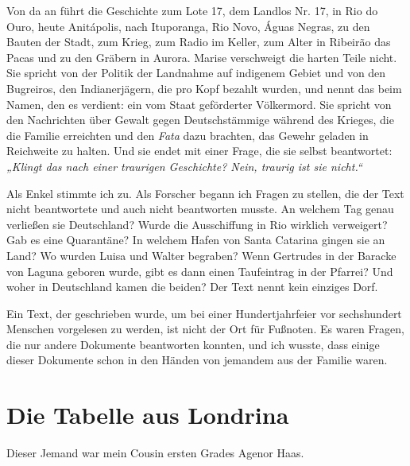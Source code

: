 \documentclass[
  ngerman,
  11pt,
  openany]{book}
\begin{document}
Von da an führt die Geschichte zum Lote 17, dem Landlos Nr. 17, in Rio
do Ouro, heute Anitápolis, nach Ituporanga, Rio Novo, Águas Negras, zu
den Bauten der Stadt, zum Krieg, zum Radio im Keller, zum Alter in
Ribeirão das Pacas und zu den Gräbern in Aurora. Marise verschweigt die
harten Teile nicht. Sie spricht von der Politik der Landnahme auf
indigenem Gebiet und von den Bugreiros, den Indianerjägern, die pro Kopf
bezahlt wurden, und nennt das beim Namen, den es verdient: ein vom Staat
geförderter Völkermord. Sie spricht von den Nachrichten über Gewalt
gegen Deutschstämmige während des Krieges, die die Familie erreichten
und den \emph{Fata} dazu brachten, das Gewehr geladen in Reichweite zu
halten. Und sie endet mit einer Frage, die sie selbst beantwortet:
\emph{„Klingt das nach einer traurigen Geschichte? Nein, traurig ist sie
nicht.``}

Als Enkel stimmte ich zu. Als Forscher begann ich Fragen zu stellen, die
der Text nicht beantwortete und auch nicht beantworten musste. An
welchem Tag genau verließen sie Deutschland? Wurde die Ausschiffung in
Rio wirklich verweigert? Gab es eine Quarantäne? In welchem Hafen von
Santa Catarina gingen sie an Land? Wo wurden Luisa und Walter begraben?
Wenn Gertrudes in der Baracke von Laguna geboren wurde, gibt es dann
einen Taufeintrag in der Pfarrei? Und woher in Deutschland kamen die
beiden? Der Text nennt kein einziges Dorf.

Ein Text, der geschrieben wurde, um bei einer Hundertjahrfeier vor
sechshundert Menschen vorgelesen zu werden, ist nicht der Ort für
Fußnoten. Es waren Fragen, die nur andere Dokumente beantworten konnten,
und ich wusste, dass einige dieser Dokumente schon in den Händen von
jemandem aus der Familie waren.

\section{Die Tabelle aus Londrina}\label{die-tabelle-aus-londrina}

Dieser Jemand war mein Cousin ersten Grades Agenor Haas.
\end{document}
